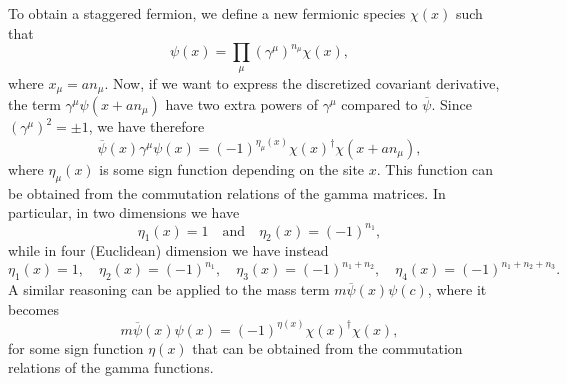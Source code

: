 To obtain a staggered fermion, we define a new fermionic species $\chi(x)$ such that
\begin{equation}
    \psi(x) = \prod_{\mu} (\gamma^{\mu})^{n_{\mu}} \chi(x),
\end{equation}
where $x_{\mu} = an_{\mu}$.
Now, if we want to express the discretized covariant derivative, the term $\gamma^{\mu} \psi(x+a n_{\mu})$ have two extra powers of $\gamma^{\mu}$ compared to $\overline{\psi}$.
Since $(\gamma^{\mu})^2 = \pm 1$, we have therefore
\begin{equation}
    \overline{\psi}(x) \gamma^{\mu} \psi(x) = (-1)^{\eta_{\mu}(x)} \chi(x)^{\dagger} \chi(x + a n_{\mu}),
\end{equation}
where $\eta_{\mu}(x)$ is some sign function depending on the site $x$.
This function can be obtained from the commutation relations of the gamma matrices.
In particular, in two dimensions we have
\begin{equation}
    \eta_1(x) = 1
    \quad \text{and} \quad
    \eta_2(x) = (-1)^{n_1},
\end{equation}
while in four (Euclidean) dimension we have instead \cite{tong2018gauge}
\begin{equation}
    \eta_1(x) = 1, \quad
    \eta_2(x) = (-1)^{n_1}, \quad
    \eta_3(x) = (-1)^{n_1 + n_2}, \quad
    \eta_4(x) = (-1)^{n_1 + n_2 + n_3}.
\end{equation}
A similar reasoning can be applied to the mass term $m \overline{\psi}(x) \psi(c)$, where it becomes
\begin{equation}
    m \overline{\psi}(x) \psi(x) = (-1)^{\eta(x)} \chi(x)^{\dagger} \chi(x),
\end{equation}
for some sign function $\eta(x)$ that can be obtained from the commutation relations of the gamma functions.

